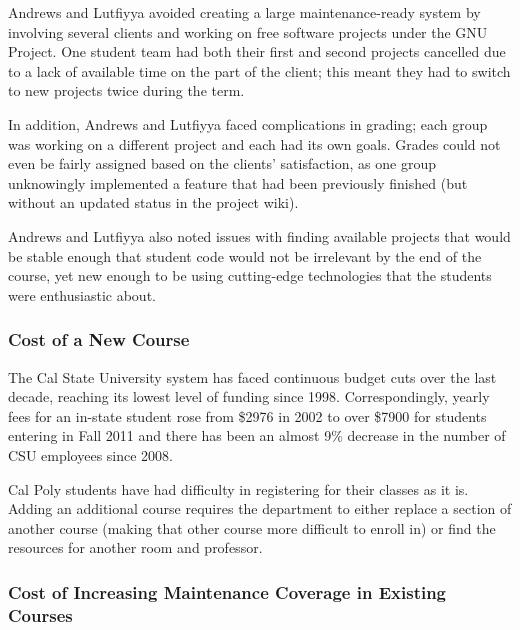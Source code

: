 \documentclass[11pt]{article}
\begin{document}
\begin{multicols}{2}
Andrews and Lutfiyya avoided creating a large maintenance-ready system by involving several clients and working on free software projects under the GNU Project.  One student team had both their first and second projects cancelled due to a lack of available time on the part of the client; this meant they had to switch to new projects twice during the term. \cite{andrews}

In addition, Andrews and Lutfiyya faced complications in grading; each group was working on a different project and each had its own goals. \cite{andrews}  Grades could not even be fairly assigned based on the clients' satisfaction, as one group unknowingly implemented a feature that had been previously finished (but without an updated status in the project wiki). \cite{andrews}

Andrews and Lutfiyya also noted issues with finding available projects that would be stable enough that student code would not be irrelevant by the end of the course, yet new enough to be using cutting-edge technologies that the students were enthusiastic about. \cite{andrews}


\subsubsection{Cost of a New Course}

The Cal State University system has faced continuous budget cuts over the last decade, reaching its lowest level of funding since 1998. \cite{tuitonFall}  Correspondingly, yearly fees for an in-state student rose from \$2976 in 2002 to over \$7900 for students entering in Fall 2011 \cite{feeHistory} and there has been an almost 9\% decrease in the number of CSU employees since 2008. \cite{tuitonFall}

Cal Poly students have had difficulty in registering for their classes as it is. \cite{scramble}  Adding an additional course requires the department to either replace a section of another course (making that other course more difficult to enroll in) or find the resources for another room and professor.

\subsubsection{Cost of Increasing Maintenance Coverage in Existing Courses}


\end{multicols}
\end{document}
